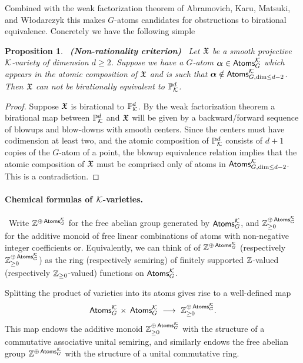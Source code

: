 \documentclass[twoside,leqno]{article}
\numberwithin{equation}{section}
\theoremstyle{plain}
\newtheorem{proposition}[equation]{Proposition}
\theoremstyle{definition}
\begin{document}
Combined with the weak factorization theorem of Abramovich, Karu, Matsuki, and W\l{}odarczyk  \cite{Wlodarczyk_factorization,Abramovich_Torification_and_factorization} this makes $G$-atoms candidates for obstructions to birational equivalence.
Concretely we have the following simple

\begin{proposition} \ {\bfseries (Non-rationality criterion) } \ \label{prop:Gnon-rational}
Let $\mathfrak X$ be a smooth projective $\mathcal K$-variety of dimension $d \geq 2$. Suppose we have a $G$-atom $\boldsymbol{\alpha} \in \mathsf{Atoms}_{G}^{\mathcal K}$ which appears in the atomic composition of $\mathfrak X$ and is such that $\boldsymbol{\alpha} \notin \mathsf{Atoms}_{G,\dim \leq d-2}^{\mathcal K}$. Then $\mathfrak X$ can not be birationally equivalent to $\mathbb P^{d}_{\mathcal K}$.
\end{proposition}
\begin{proof} Suppose $\mathfrak X$ is birational to $\mathbb P^{d}_{\mathcal K}$. By the weak factorization theorem 
\cite{Wlodarczyk_factorization,Abramovich_Torification_and_factorization} a birational  map between $\mathbb P^{d}_{\mathcal K}$ and $\mathfrak X$ will be given by a backward/forward sequence of blowups and blow-downs with smooth centers. Since the centers must have codimension at least two, and the  atomic composition of $\mathbb P^{d}_{\mathcal K}$ consists of $d+1$ copies of the $G$-atom of a point, the blowup equivalence relation implies  that the atomic composition of $\mathfrak X$ must be comprised only of atoms in $\mathsf{Atoms}_{G,\dim \leq d-2}^{\mathcal K}$. This is a contradiction. 
\end{proof}

\paragraph{Chemical formulas of \texorpdfstring{$\mathcal K$}{K}-varieties.} \label{par:CFkay}
\ Write $\mathbb Z^{\oplus \, \mathsf{Atoms}^{\mathcal K}_{G}}$  for the free abelian group generated by $\mathsf{Atoms}^{\mathcal K}_{G}$, and  $\mathbb Z^{\oplus \, \mathsf{Atoms}^{\mathcal K}_{G}}_{\geq 0}$ for the additive monoid of free linear combinations of atoms with non-negative integer coefficients or. Equivalently,  we can think of 
of $\mathbb Z^{\oplus \, \mathsf{Atoms}^{\mathcal K}_{G}}$ (respectively $\mathbb Z^{\oplus \, \mathsf{Atoms}^{\mathcal K}_{G}}_{\geq 0}$) as the ring (respectively semiring) of finitely  supported $\mathbb Z$-valued (respectively $\mathbb Z_{\geq 0}$-valued) functions on $\mathsf{Atoms}^{\mathcal K}_{G}$.


Splitting the  product of varieties into its atoms gives rise to a 
well-defined map
\[
\mathsf{Atoms}^{\mathcal K}_{G} \, \times \, \mathsf{Atoms}^{\mathcal K}_{G} \  
\longrightarrow  \ \mathbb Z^{\oplus \, \mathsf{Atoms}^{\mathcal K}_{G}}_{\ge 0}.
\]
This map endows the additive  monoid 
$\mathbb Z^{\oplus \, \mathsf{Atoms}^{\mathcal K}_{G}}_{\ge 0}$
with the structure of a commutative associative unital semiring, and similarly endows the free abelian group 
$\mathbb Z^{\oplus \, \mathsf{Atoms}^{\mathcal K}_{G}}$
with the structure of a unital commutative ring.
\end{document}

